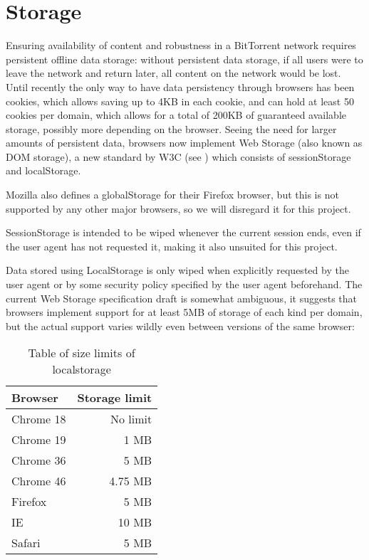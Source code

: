 \section{Storage}
Ensuring availability of content and robustness in a BitTorrent network requires persistent offline data storage:
without persistent data storage, if all users were to leave the network and return later, all content on the 
network would be lost.
\newline\newline
Until recently the only way to have data persistency through browsers has been cookies, 
which allows saving up to 4KB in each cookie, and can hold at least 50 cookies per domain, 
which allows for a total of 200KB of guaranteed available storage, possibly more depending on the browser.
\newline\newline
Seeing the need for larger amounts of persistent data, browsers now implement Web Storage 
(also known as DOM storage), a new standard by W3C (see \citep{WebStorage})
which consists of sessionStorage and localStorage.

Mozilla also defines a globalStorage for their Firefox browser, 
but this is not supported by any other major browsers, so we will disregard it for this project.

SessionStorage is intended to be wiped whenever the current session ends, 
even if the user agent has not requested it, making it also unsuited for this project.

Data stored using LocalStorage is only wiped when explicitly requested by the user agent or 
by some security policy specified by the user agent beforehand.
\newline\newline
The current Web Storage specification draft is somewhat ambiguous, 
it suggests that browsers implement support for at least 5MB of storage of each kind per domain,
but the actual support varies wildly even between versions of the same browser:

\begin{table}[H]
	\centering
	\begin{tabular}{l | r}
        Browser   & Storage limit \\ \hline
		Chrome 18 & No limit  \\
		Chrome 19 & 1    MB   \\
		Chrome 36 & 5    MB   \\
		Chrome 46 & 4.75 MB   \\
		Firefox   & 5    MB   \\
		IE        & 10   MB   \\
		Safari    & 5    MB   \\
	\end{tabular}
	\caption{Table of size limits of localstorage}
	\label{table:browserls}
\end{table}

